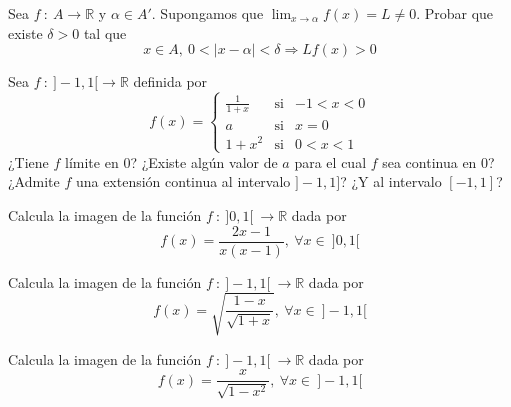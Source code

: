 \begin{ejercicio}
    Sea $f ~:~ A \longrightarrow \mathbb{R}$ y $\alpha \in A'$. Supongamos que $\displaystyle\lim_{x \to \alpha} f(x) = L \neq 0$. Probar que existe $\delta > 0$ tal que
    \begin{equation*}
        x \in A, ~ 0 < |x-\alpha| < \delta \Longrightarrow L f(x) > 0
    \end{equation*}
\end{ejercicio}

\begin{ejercicio}
    Sea $f ~:~ ]-1,1[ \longrightarrow \mathbb{R}$ definida por
    \begin{equation*}
        f(x)=
        \left\{ \begin{array}{ccl}
            \frac{1}{1+x} & \text{si} & -1 < x < 0 \\
            a & \text{si} & x  = 0 \\
            1+x^2 & \text{si} & 0 < x < 1
        \end{array}
        \right.
    \end{equation*}
    ¿Tiene $f$ límite en $0$? ¿Existe algún valor de $a$ para el cual $f$ sea continua en $0$? ¿Admite $f$ una extensión continua
    al intervalo $]-1,1]$? ¿Y al intervalo $[-1,1]$?
\end{ejercicio}

\begin{ejercicio}
    Calcula la imagen de la función $f ~:~ ]0,1[ ~\longrightarrow \mathbb{R}$ dada por
    \begin{equation*}
        f(x) = \frac{2x-1}{x(x-1)}, ~ \forall x \in ~ ]0,1[
    \end{equation*}
\end{ejercicio}

\begin{ejercicio}
    Calcula la imagen de la función $f ~:~ ]-1,1[ ~\longrightarrow \mathbb{R}$ dada por
    \begin{equation*}
        f(x) = \sqrt{\frac{1-x}{\sqrt{1+x}}}, ~ \forall x \in ~ ]-1,1[
    \end{equation*}
\end{ejercicio}

\begin{ejercicio}
    Calcula la imagen de la función $f ~:~ ]-1,1[ ~\longrightarrow \mathbb{R}$ dada por
    \begin{equation*}
        f(x) = \frac{x}{\sqrt{1-x^2}}, ~ \forall x \in ~ ]-1,1[
    \end{equation*}
\end{ejercicio}

